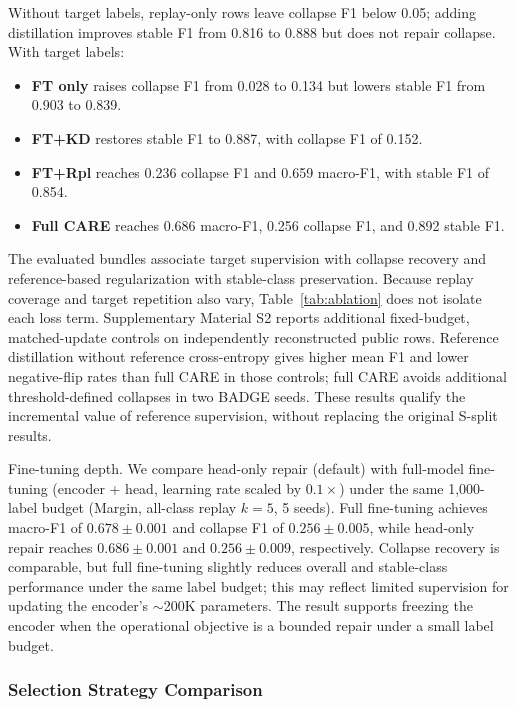 \documentclass[preprint,12pt,authoryear]{elsarticle}
\newcommand{\ours}{CARE}  %
\begin{document}
Without target labels, replay-only rows leave collapse F1 below 0.05; adding distillation improves stable F1 from 0.816 to 0.888 but does not repair collapse. With target labels:
\begin{itemize}
  \item \textbf{FT only} raises collapse F1 from 0.028 to 0.134 but lowers stable F1 from 0.903 to 0.839.
  \item \textbf{FT+KD} restores stable F1 to 0.887, with collapse F1 of 0.152.
  \item \textbf{FT+Rpl} reaches 0.236 collapse F1 and 0.659 macro-F1, with stable F1 of 0.854.
  \item \textbf{Full \ours{}} reaches 0.686 macro-F1, 0.256 collapse F1, and 0.892 stable F1.
\end{itemize}
The evaluated bundles associate target supervision with collapse recovery and reference-based regularization with stable-class preservation. Because replay coverage and target repetition also vary, Table~\ref{tab:ablation} does not isolate each loss term. Supplementary Material S2 reports additional fixed-budget, matched-update controls on independently reconstructed public rows. Reference distillation without reference cross-entropy gives higher mean F1 and lower negative-flip rates than full CARE in those controls; full CARE avoids additional threshold-defined collapses in two BADGE seeds. These results qualify the incremental value of reference supervision, without replacing the original S-split results.

Fine-tuning depth.
We compare head-only repair (default) with full-model fine-tuning (encoder + head, learning rate scaled by $0.1{\times}$) under the same 1{,}000-label budget (Margin, all-class replay $k{=}5$, 5 seeds).
Full fine-tuning achieves macro-F1 of $0.678{\pm}0.001$ and collapse F1 of $0.256{\pm}0.005$, while head-only repair reaches $0.686{\pm}0.001$ and $0.256{\pm}0.009$, respectively.
Collapse recovery is comparable, but full fine-tuning slightly reduces overall and stable-class performance under the same label budget; this may reflect limited supervision for updating the encoder's ${\sim}$200K parameters.
The result supports freezing the encoder when the operational objective is a bounded repair under a small label budget.

\subsubsection{Selection Strategy Comparison}
\label{sec:al_baselines}
\end{document}
